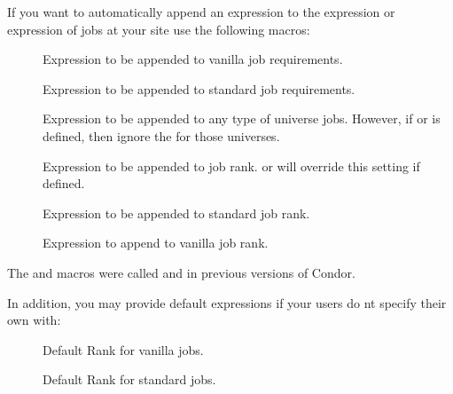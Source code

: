 If you want  to automatically append an expression to
the  expression or  expression of 
jobs at your site use the following macros:
\begin{description}
  
\item[] \label{param:AppendReqVanilla}
  Expression to be appended to vanilla job requirements.
  
\item[] \label{param:AppendReqStandard}
  Expression to be appended to standard job requirements.

\item[] \label{param:AppendReq}
  Expression to be appended to any type of universe jobs. 
  However, if  or 
  is defined, then ignore the  for those
  universes.

\item[] \label{param:AppendRank}
  Expression to be appended to job rank.   or
     will override this setting if defined.

\item[] \label{param:AppendRankStandard}
  Expression to be appended to standard job rank.

\item[] \label{param:AppendRankVanilla}
  Expression to append to vanilla job rank.

\end{description}

\Note The  and 
 macros were called
 and
 in previous versions of Condor.

In addition, you may provide default  expressions if your users
do nt specify their own with:

\begin{description}

\item[] \label{param:DefaultRankVanilla}
  Default Rank for vanilla jobs.  

\item[] \label{param:DefaultRankStandard}
  Default Rank for standard jobs.


\end{description}

